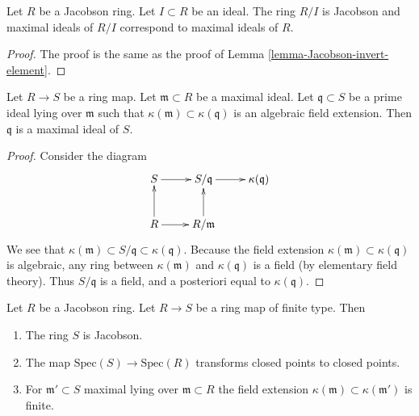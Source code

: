 \begin{lemma}
\label{lemma-Jacobson-mod-ideal}
Let $R$ be a Jacobson ring. Let $I \subset R$ be an ideal.
The ring $R/I$ is Jacobson and maximal ideals
of $R/I$ correspond to maximal ideals of $R$.
\end{lemma}

\begin{proof}
The proof is the same as the proof of
Lemma \ref{lemma-Jacobson-invert-element}.
\end{proof}

\begin{lemma}
\label{lemma-finite-residue-extension-closed}
Let $R \to S$ be a ring map.
Let $\mathfrak m \subset R$ be a maximal ideal.
Let $\mathfrak q \subset S$ be a prime ideal
lying over $\mathfrak m$ such that $\kappa(\mathfrak m)
\subset \kappa(\mathfrak q)$ is an algebraic field extension.
Then $\mathfrak q$ is a maximal ideal of $S$.
\end{lemma}

\begin{proof}
Consider the diagram
$$
\xymatrix{
S \ar[r] & S/\mathfrak q \ar[r] & \kappa(\mathfrak q) \\
R \ar[r] \ar[u] & R/\mathfrak m \ar[u]
}
$$
We see that $\kappa(\mathfrak m) \subset S/\mathfrak q \subset
\kappa(\mathfrak q)$. Because the field extension
$\kappa(\mathfrak m) \subset \kappa(\mathfrak q)$
is algebraic, any ring between $\kappa(\mathfrak m)$
and $\kappa(\mathfrak q)$ is a field (by elementary
field theory). Thus $S/\mathfrak q$ is a field, and a posteriori equal
to $\kappa(\mathfrak q)$.
\end{proof}

\begin{proposition}
\label{proposition-Jacobson-permanence}
Let $R$ be a Jacobson ring. Let $R \to S$ be a
ring map of finite type. Then
\begin{enumerate}
\item The ring $S$ is Jacobson.
\item The map $\text{Spec}(S) \to \text{Spec}(R)$ transforms
closed points to closed points.
\item For $\mathfrak m' \subset S$ maximal lying over $\mathfrak m \subset R$
the field extension $\kappa(\mathfrak m) \subset \kappa(\mathfrak m')$
is finite.
\end{enumerate}
\end{proposition}

